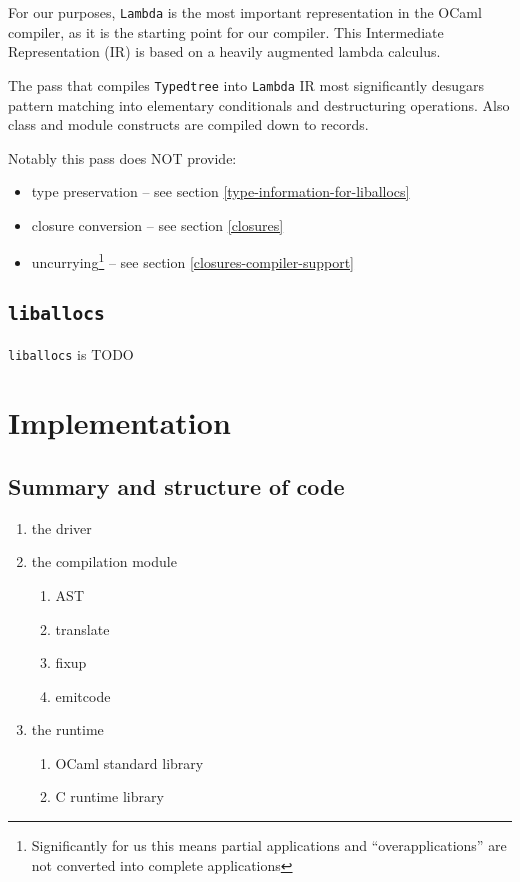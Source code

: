 \documentclass[12pt,a4paper,twoside,openright]{report}
\begin{document}
For our purposes, \lstinline!Lambda! is the most important representation in
the OCaml compiler, as it is the starting point for our compiler. This
Intermediate Representation (IR) is based on a heavily augmented lambda calculus.

The pass that compiles \lstinline!Typedtree! into \lstinline!Lambda! IR most
significantly desugars pattern matching into elementary conditionals and
destructuring operations. Also class and module constructs are compiled down to
records.

Notably this pass does NOT provide:

\begin{itemize}
    \item type preservation -- see section \ref{type-information-for-liballocs}
    \item closure conversion -- see section \ref{closures}
    \item uncurrying\footnote{Significantly for us this means
        partial applications and ``overapplications'' are not converted into
        complete applications} -- see section \ref{closures-compiler-support}
\end{itemize}


\section{\texttt{liballocs}}

\lstinline!liballocs! is TODO


\chapter{Implementation}

\section{Summary and structure of code}

\begin{enumerate}
  \item the driver
  \item the compilation module
    \begin{enumerate}
      \item AST
      \item translate
      \item fixup
      \item emitcode
    \end{enumerate}
  \item the runtime
    \begin{enumerate}
      \item OCaml standard library
      \item C runtime library
    \end{enumerate}
\end{enumerate}
\end{document}
